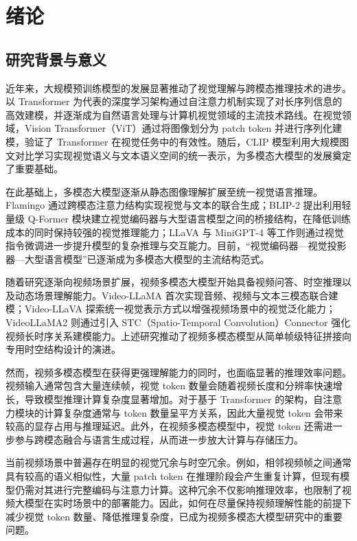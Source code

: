 \cleardoublepage

\section{绪论}

\subsection{研究背景与意义}

近年来，大规模预训练模型的发展显著推动了视觉理解与跨模态推理技术的进步。以 Transformer 为代表的深度学习架构通过自注意力机制实现了对长序列信息的高效建模\cite{transformer2017}，并逐渐成为自然语言处理与计算机视觉领域的主流技术路线。在视觉领域，Vision Transformer（ViT）通过将图像划分为 patch token 并进行序列化建模，验证了 Transformer 在视觉任务中的有效性\cite{vit2021}。随后，CLIP 模型利用大规模图文对比学习实现视觉语义与文本语义空间的统一表示，为多模态大模型的发展奠定了重要基础\cite{clip2021}。

在此基础上，多模态大模型逐渐从静态图像理解扩展至统一视觉语言推理。Flamingo 通过跨模态注意力结构实现视觉与文本的联合生成\cite{flamingo2022}；BLIP-2 提出利用轻量级 Q-Former 模块建立视觉编码器与大型语言模型之间的桥接结构，在降低训练成本的同时保持较强的视觉推理能力\cite{blip22023}；LLaVA 与 MiniGPT-4 等工作则通过视觉指令微调进一步提升模型的复杂推理与交互能力\cite{llava2023,minigpt42023}。目前，“视觉编码器—视觉投影器—大型语言模型”已逐渐成为多模态大模型的主流结构范式。

随着研究逐渐向视频场景扩展，视频多模态大模型开始具备视频问答、时空推理以及动态场景理解能力。Video-LLaMA 首次实现音频、视频与文本三模态联合建模\cite{videollama2023}；Video-LLaVA 探索统一视觉表示方式以增强视频场景中的视觉泛化能力\cite{videollava2023}；VideoLLaMA2 则通过引入 STC（Spatio-Temporal Convolution）Connector 强化视频长时序关系建模能力\cite{videollama22024}。上述研究推动了视频多模态模型从简单帧级特征拼接向专用时空结构设计的演进。

然而，视频多模态模型在获得更强理解能力的同时，也面临显著的推理效率问题。视频输入通常包含大量连续帧，视觉 token 数量会随着视频长度和分辨率快速增长，导致模型推理计算复杂度显著增加。对于基于 Transformer 的架构，自注意力模块的计算复杂度通常与 token 数量呈平方关系，因此大量视觉 token 会带来较高的显存占用与推理延迟\cite{timesformer2021,vivit2021}。此外，在视频多模态模型中，视觉 token 还需进一步参与跨模态融合与语言生成过程，从而进一步放大计算与存储压力。

当前视频场景中普遍存在明显的视觉冗余与时空冗余。例如，相邻视频帧之间通常具有较高的语义相似性，大量 patch token 在推理阶段会产生重复计算，但现有模型仍需对其进行完整编码与注意力计算。这种冗余不仅影响推理效率，也限制了视频大模型在实时场景中的部署能力。因此，如何在尽量保持视频理解性能的前提下减少视觉 token 数量、降低推理复杂度，已成为视频多模态大模型研究中的重要问题。

